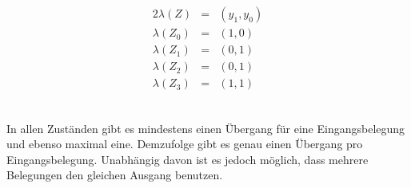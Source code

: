 \documentclass[10pt,a4paper,oneside,ngerman,numbers=noenddot]{scrartcl}
\begin{document}
\begin{alignat*}{2}
\lambda(Z) &=& (y_{1}, y_{0}) \\
\lambda(Z_{0}) &=& (1, 0) \\
\lambda(Z_{1}) &=& (0, 1) \\
\lambda(Z_{2}) &=& (0, 1) \\
\lambda(Z_{3}) &=& (1, 1) \\
\end{alignat*}
\subsection{} %
In allen Zuständen gibt es mindestens einen Übergang für eine Eingangsbelegung und ebenso maximal eine. Demzufolge gibt es genau einen Übergang pro Eingangsbelegung. Unabhängig davon ist es jedoch möglich, dass mehrere Belegungen den gleichen Ausgang benutzen.
\end{document}
